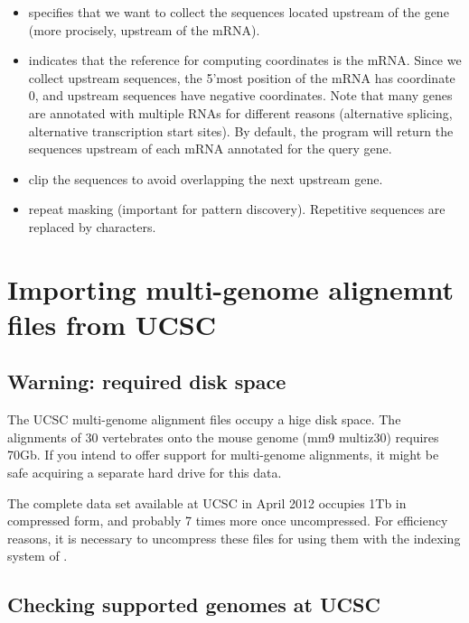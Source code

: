 \begin{itemize}

\item {} specifies that we want to collect the
  sequences located upstream of the gene (more procisely, upstream of
  the mRNA).

\item {} indicates that the reference for computing
  coordinates is the mRNA. Since we collect upstream sequences, the
  5'most position of the mRNA has coordinate 0, and upstream sequences
  have negative coordinates. Note that many genes are annotated with
  multiple RNAs for different reasons (alternative splicing,
  alternative transcription start sites). By default, the program will
  return the sequences upstream of each mRNA annotated for the query
  gene.

\item {} clip the sequences to avoid overlapping the next
  upstream gene.

\item {} repeat masking (important for pattern
  discovery). Repetitive sequences are replaced by  characters.

\end{itemize} 

\section{Importing multi-genome alignemnt files from UCSC}

\subsection{Warning: required disk space}

The UCSC multi-genome alignment files occupy a hige disk space. The
alignments of 30 vertebrates onto the mouse genome (mm9 multiz30)
requires 70Gb. If you intend to offer support for multi-genome
alignments, it might be safe acquiring a separate hard drive for this
data.

The complete data set available at UCSC in April 2012 occupies 1Tb in
compressed form, and probably 7 times more once uncompressed. For
efficiency reasons, it is necessary to uncompress these files for
using them with the indexing system of  .

\subsection{Checking supported genomes at UCSC}

